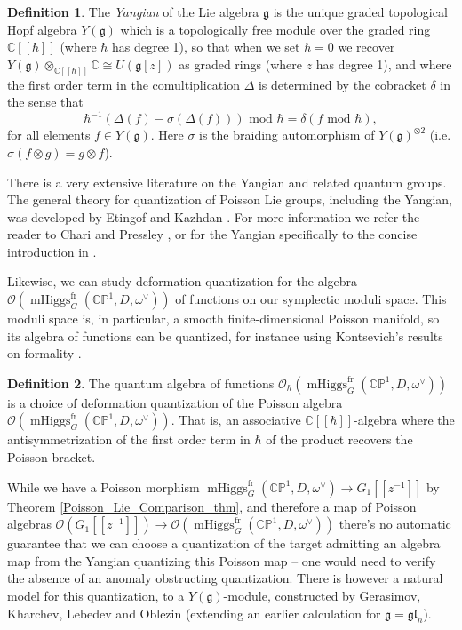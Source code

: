 \documentclass[11pt, oneside, reqno]{amsart}
\theoremstyle{definition} \newtheorem{definition}{Definition}[section]
\theoremstyle{definition} \newtheorem{remark}[definition]{Remark}
\theoremstyle{definition} \newtheorem{remarks}[definition]{Remarks}
\theoremstyle{definition} \newtheorem{question}[definition]{Question}
\theoremstyle{definition} \newtheorem*{note}{Note}
\theoremstyle{definition} \newtheorem{example}[definition]{Example}
\theoremstyle{definition} \newtheorem{examples}[definition]{Examples}
\renewcommand{\gg}{\mathfrak{g}}
\newcommand{\bb}[1]{\mathbb{#1}}
\newcommand{\CC}{\mathbb{C}}
\newcommand{\OO}{\mathcal{O}}
\newcommand{\gl}{\mathfrak{gl}}
\newcommand{\iso}{\cong}
\DeclareMathOperator{\mhiggs}{mHiggs}
\newcommand{\fr}{\mathrm{fr}}
\begin{document}
\begin{definition}
The \emph{Yangian} of the Lie algebra $\gg$ is the unique graded topological Hopf algebra $Y(\gg)$ which is a topologically free module over the graded ring $\CC[[\hbar]]$ (where $\hbar$ has degree 1), so that when we set $\hbar=0$ we recover $Y(\gg) \otimes_{\CC[[\hbar]]} \CC \iso U(\gg[z])$ as graded rings (where $z$ has degree 1), and where the first order term in the comultiplication $\Delta$ is determined by the cobracket $\delta$ in the sense that
\[\hbar^{-1}(\Delta(f) - \sigma(\Delta(f))) \text{ mod } \hbar = \delta(f \text{ mod } \hbar),\]
for all elements $f \in Y(\gg)$.  Here $\sigma$ is the braiding automorphism of $Y(\gg)^{\otimes 2}$ (i.e. $\sigma(f \otimes g) = g \otimes f$).
\end{definition}

There is a very extensive literature on the Yangian and related quantum groups.  The general theory for quantization of Poisson Lie groups, including the Yangian, was developed by Etingof and Kazhdan \cite{EtingofKazhdanIII}.  For more information we refer the reader to Chari and Pressley \cite{ChariPressley}, or for the Yangian specifically to the concise introduction in \cite[Section 9]{CostelloYangian}.

Likewise, we can study deformation quantization for the algebra $\OO(\mhiggs^\fr_G(\bb{CP}^1,D,\omega^\vee))$ of functions on our symplectic moduli space.  This moduli space is, in particular, a smooth finite-dimensional Poisson manifold, so its algebra of functions can be quantized, for instance using Kontsevich's results on formality \cite{KontsevichQuantization}.

\begin{definition}
The quantum algebra of functions $\OO_\hbar(\mhiggs^\fr_G(\bb{CP}^1,D,\omega^\vee))$ is a choice of deformation quantization of the Poisson algebra $\OO(\mhiggs^\fr_G(\bb{CP}^1,D,\omega^\vee))$.  That is, an associative $\CC[[\hbar]]$-algebra where the antisymmetrization of the first order term in $\hbar$ of the product recovers the Poisson bracket. 
\end{definition}

While we have a Poisson morphism $\mhiggs^\fr_G(\bb{CP}^1,D,\omega^\vee) \to G_1[[z^{-1}]]$ by Theorem \ref{Poisson_Lie_Comparison_thm}, and therefore a map of Poisson algebras $\OO(G_1[[z^{-1}]]) \to \OO(\mhiggs^\fr_G(\bb{CP}^1,D,\omega^\vee))$ there's no automatic guarantee that we can choose a quantization of the target admitting an algebra map from the Yangian quantizing this Poisson map -- one would need to verify the absence of an anomaly obstructing quantization.  There is however a natural model for this quantization, to a $Y(\gg)$-module,  constructed by Gerasimov, Kharchev, Lebedev and Oblezin \cite{GKLO} (extending an earlier calculation \cite{GKL} for $\gg = \gl_n$).
\end{document}
